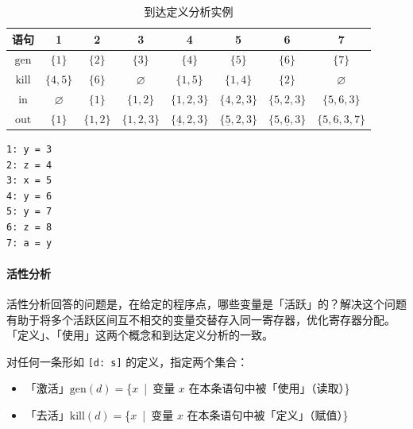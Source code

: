 \documentclass[UTF8]{ctexart}
\newcommand\OR{\ |\ }
\newcommand\GEN{\mathrm{gen}}
\newcommand\KILL{\mathrm{kill}}
\newcommand\IN{\mathrm{in}}
\newcommand\OUT{\mathrm{out}}
\newcommand\Emph[1]{\textcolor{cyan!80!black}{#1}}
\newcommand\Notes[1]{\textcolor{yellow!50!black}{\small #1}}
\begin{document}
\begin{table}[htb]
    \begin{minipage}[c]{.89\textwidth}
        \centering
        \vspace{0pt}
        \small
        \begin{tabular}{cccccccc}
        \toprule
        语句 & 1 & 2 & 3 & 4 & 5 & 6 & 7 \\
        \midrule
        $\GEN$ & $\{1\}$ & $\{2\}$ & $\{3\}$ & $\{4\}$ & $\{5\}$ & $\{6\}$ & $\{7\}$ \\
        $\KILL$ & $\{4,5\}$ & $\{6\}$ & $\varnothing$ & $\{1,5\}$ & $\{1,4\}$ & $\{2\}$ & $\varnothing$ \\
        \midrule
        $\IN$  & $\varnothing$ & $\{1\}$ & $\{1,2\}$ & $\{1,2,3\}$ & $\{4,2,3\}$ &  $\{5,2,3\}$ & $\{5,6,3\}$ \\
        $\OUT$ & $\{1\}$ & $\{1,2\}$ & $\{1,2,3\}$ & $\{\underline{4},2,3\}$ & $\{\underline{5},2,3\}$ & $\{5,\underline{6},3\}$ & $\{5,6,3,7\}$ \\
        \bottomrule
        \end{tabular}
    \end{minipage}
    \begin{minipage}[c]{.1\textwidth}
        \centering\small
        \begin{verbatim}
1: y = 3
2: z = 4
3: x = 5
4: y = 6
5: y = 7
6: z = 8
7: a = y
        \end{verbatim}
    \end{minipage}
    \caption{到达定义分析实例}\label{tab:到达定义}
\end{table}

\paragraph{活性分析}
\Emph{活性分析}回答的问题是，在给定的程序点，哪些变量是「活跃」的？解决这个问题有助于将多个活跃区间互不相交的变量交替存入同一寄存器，优化寄存器分配。「定义」、「使用」这两个概念和到达定义分析的一致。

对任何一条形如 \verb![d: s]! 的定义，指定两个集合：
\begin{itemize}[itemsep=0pt,parsep=0pt,leftmargin=1.5cm]
  \item 「激活」$\GEN(d) = $\{$x$\OR 变量 $x$ 在本条语句中被「使用」\Notes{（读取）}\}
  \item 「去活」$\KILL(d) = $\{$x$\OR 变量 $x$ 在本条语句中被「定义」\Notes{（赋值）}\}
\end{itemize}
\end{document}
